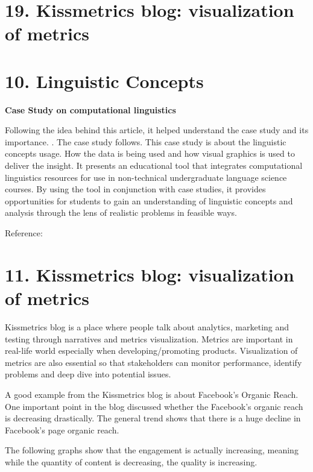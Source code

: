 \documentclass[]{book}
\theoremstyle{definition}
\theoremstyle{definition}
\theoremstyle{definition}
\theoremstyle{remark}
\begin{document}
\section{19. Kissmetrics blog: visualization of
metrics}\label{kissmetrics-blog-visualization-of-metrics}

\citep{facebook_organic}

\section{10. Linguistic Concepts}\label{linguistic-concepts-1}

\textbf{Case Study on computational linguistics}

Following the idea behind this article, it helped understand the case
study and its importance. \citep{article_case}. The case study follows.
This case study is about the linguistic concepts usage. How the data is
being used and how visual graphics is used to deliver the insight. It
presents an educational tool that integrates computational linguistics
resources for use in non-technical undergraduate language science
courses. By using the tool in conjunction with case studies, it provides
opportunities for students to gain an understanding of linguistic
concepts and analysis through the lens of realistic problems in feasible
ways.

Reference: \citep{lingui_data}

\section{11. Kissmetrics blog: visualization of
metrics}\label{kissmetrics-blog-visualization-of-metrics-1}

Kissmetrics blog is a place where people talk about analytics, marketing
and testing through narratives and metrics visualization. Metrics are
important in real-life world especially when developing/promoting
products. Visualization of metrics are also essential so that
stakeholders can monitor performance, identify problems and deep dive
into potential issues.

A good example from the Kissmetrics blog is about Facebook's Organic
Reach. One important point in the blog discussed whether the Facebook's
organic reach is decreasing drastically. The general trend shows that
there is a huge decline in Facebook's page organic reach.

The following graphs show that the engagement is actually increasing,
meaning while the quantity of content is decreasing, the quality is
increasing.
\end{document}

